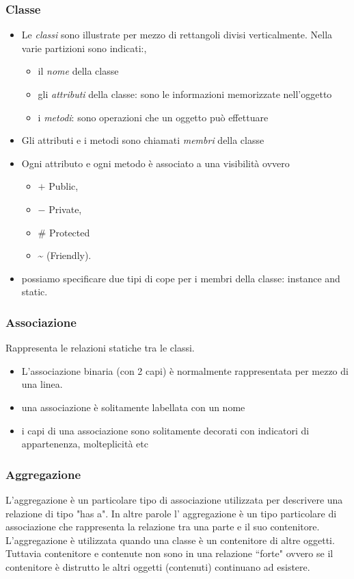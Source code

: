 \documentclass{article}
\begin{document}
\subsubsection{Classe}
\begin{itemize}
\item  Le \textit{classi} sono illustrate per mezzo di rettangoli divisi verticalmente. Nella varie partizioni sono indicati:,
\begin{itemize}
\item il \emph{nome} della classe
\item gli \emph{attributi} della classe: sono le informazioni memorizzate nell'oggetto
\item i \emph{metodi}: sono operazioni che un oggetto pu\`o effettuare
\end{itemize}
\item Gli attributi e i metodi sono chiamati \emph{membri} della classe 
\item Ogni attributo e ogni metodo \`e associato a una visibilit\`a ovvero
\begin{itemize}
\item  $+$ Public,
\item  $-$ Private,
\item $\#$ Protected
\item  \~{} (Friendly).
\end{itemize}
\item possiamo specificare due tipi di cope per i membri della classe: instance and static.
\end{itemize}


\subsubsection{Associazione}
Rappresenta le relazioni statiche tra le classi. 
\begin{itemize}
\item L'associazione binaria (con 2 capi) \`e normalmente rappresentata per mezzo di una linea.
\item una associazione \`e solitamente labellata con un nome
\item i capi di una associazione sono solitamente decorati con indicatori di appartenenza, molteplicit\`a etc
\end{itemize}

\subsubsection{Aggregazione}
L'aggregazione \`e un particolare tipo di associazione utilizzata per descrivere una relazione di tipo "has a". In altre parole l' aggregazione \`e un tipo particolare di associazione che rappresenta la relazione tra una parte e il suo contenitore. L'aggregazione \`e utilizzata quando una classe \`e un contenitore di altre oggetti. Tuttavia contenitore e contenute non sono in una relazione ``forte" ovvero se il contenitore \`e distrutto le altri oggetti (contenuti) continuano ad esistere. 
\end{document}
